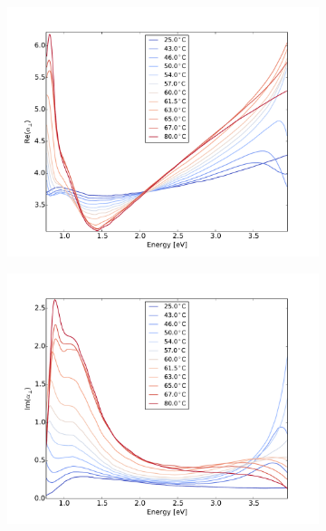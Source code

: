 %
%
\begin{figure}
    \centering
    \begin{subfigure}[b]{0.49\textwidth}
        \centering
        \includegraphics[width=\textwidth]{Results/Sim4/re_alpha_perp.pdf}
        \caption{}
        \label{fig:}
    \end{subfigure}
    \begin{subfigure}[b]{0.49\textwidth}
        \centering
        \includegraphics[width=\textwidth]{Results/Sim4/im_alpha_perp.pdf}
        \caption{}
        \label{fig:}
    \end{subfigure}

\end{figure}

